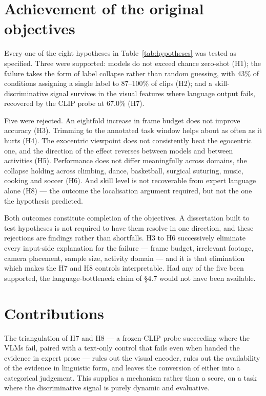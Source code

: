 \section{Achievement of the original objectives}

Every one of the eight hypotheses in Table~\ref{tab:hypotheses} was tested as
specified. Three were supported: models do not exceed chance zero-shot (H1);
the failure takes the form of label collapse rather than random guessing,
with 43\% of conditions assigning a single label to 87--100\% of clips (H2);
and a skill-discriminative signal survives in the visual features where
language output fails, recovered by the CLIP probe at 67.0\% (H7).

Five were rejected. An eightfold increase in frame budget does not improve
accuracy (H3). Trimming to the annotated task window helps about as often as
it hurts (H4). The exocentric viewpoint does not consistently beat the
egocentric one, and the direction of the effect reverses between models and
between activities (H5). Performance does not differ meaningfully across
domains, the collapse holding across climbing, dance, basketball, surgical
suturing, music, cooking and soccer (H6). And skill level is not recoverable
from expert language alone (H8) --- the outcome the localisation argument
required, but not the one the hypothesis predicted.

Both outcomes constitute completion of the objectives. A dissertation built
to test hypotheses is not required to have them resolve in one direction,
and these rejections are findings rather than shortfalls. H3 to H6
successively eliminate every input-side explanation for the failure ---
frame budget, irrelevant footage, camera placement, sample size, activity
domain --- and it is that elimination which makes the H7 and H8 controls
interpretable. Had any of the five been supported, the language-bottleneck
claim of §4.7 would not have been available.

\section{Contributions}

 The
triangulation of H7 and H8 --- a frozen-CLIP probe succeeding where the VLMs
fail, paired with a text-only control that fails even when handed the
evidence in expert prose --- rules out the visual encoder, rules out the
availability of the evidence in linguistic form, and leaves the conversion
of either into a categorical judgement. This supplies a mechanism rather
than a score, on a task where the discriminative signal is purely dynamic
and evaluative.

